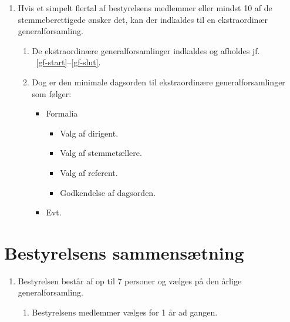 \documentclass[a4paper]{article}
\newenvironment{stykenum}{
  \begin{enumerate}[%
    label=Stk.~\arabic*., ref=\textsection~\theenumi~Stk.~\arabic*, start=2]
}{\end{enumerate}}
\begin{document}
\begin{enumerate}[resume*=afsnit]

\item Hvis et simpelt flertal af bestyrelsens medlemmer eller mindst 10 af de
stemmeberettigede ønsker det, kan der indkaldes til en ekstraordinær
generalforsamling.

  \begin{stykenum}

  \item De ekstraordinære generalforsamlinger indkaldes og afholdes jf.\\
        \textsection~\ref{gf-start}--\ref{gf-slut}.

  \item Dog er den minimale dagsorden til ekstraordinære generalforsamlinger
        som følger:

        \begin{itemize}
        \item Formalia
          \begin{itemize}
          \item Valg af dirigent.
          \item Valg af stemmetællere.
          \item Valg af referent.
          \item Godkendelse af dagsorden.
          \end{itemize}
        \item Evt.
        \end{itemize}

  \end{stykenum}

\end{enumerate}


\section*{Bestyrelsens sammensætning}

\begin{enumerate}[resume*=afsnit]

\item Bestyrelsen består af op til 7 personer og vælges på den årlige
generalforsamling.

  \begin{stykenum}

  \item Bestyrelsens medlemmer vælges for 1 år ad gangen.

  \end{stykenum}

\end{enumerate}
\end{document}
